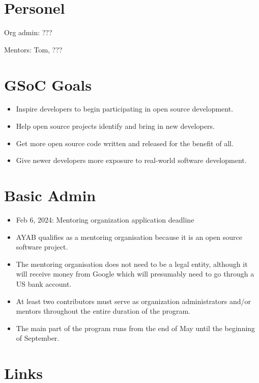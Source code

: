 \documentclass{article}
\begin{document}
\section{Personel}

\begin{flushleft}
Org admin: ???

Mentors: Tom, ???
\end{flushleft}

\section{GSoC Goals}

\begin{itemize}
\item Inspire developers to begin participating in open source development.
\item Help open source projects identify and bring in new developers.
\item Get more open source code written and released for the benefit of all.
\item Give newer developers more exposure to real-world software development.
\end{itemize}

\section{Basic Admin}

\begin{itemize}
\item Feb 6, 2024: Mentoring organization application deadline
\item AYAB qualifies as a mentoring organisation because it is an open source software project.
\item The mentoring organisation does not need to be a legal entity, although it will receive money from Google which will presumably need to go through a US bank account.
\item At least two contributors must serve as organization administrators and/or mentors throughout the entire duration of the program.
\item The main part of the program runs from the end of May until the beginning of September.
\end{itemize}

\section{Links}
\end{document}
